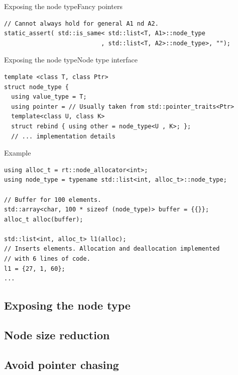 \documentclass[10pt,aspectratio=169]{beamer}
\begin{document}
\begin{frame}[fragile]{Exposing the node type}{Fancy pointers}

\begin{lstlisting}
// Cannot always hold for general A1 nd A2.
static_assert( std::is_same< std::list<T, A1>::node_type
                           , std::list<T, A2>::node_type>, "");
\end{lstlisting}

\end{frame}

\begin{frame}[fragile]{Exposing the node type}{Node type interface}

\begin{lstlisting}
template <class T, class Ptr>
struct node_type {
  using value_type = T;
  using pointer = // Usually taken from std::pointer_traits<Ptr>
  template<class U, class K>
  struct rebind { using other = node_type<U , K>; };
  // ... implementation details
\end{lstlisting}

\end{frame}

\begin{frame}[fragile]{Example}

\begin{lstlisting}
using alloc_t = rt::node_allocator<int>;
using node_type = typename std::list<int, alloc_t>::node_type;

// Buffer for 100 elements.
std::array<char, 100 * sizeof (node_type)> buffer = {{}};
alloc_t alloc(buffer);

std::list<int, alloc_t> l1(alloc);
// Inserts elements. Allocation and deallocation implemented
// with 6 lines of code.
l1 = {27, 1, 60};
...
\end{lstlisting}

\end{frame}

\subsection[Exposing the node type]{Exposing the node type}
\subsection[Node size reduction]{Node size reduction}
\subsection[Avoid pointer chasing]{Avoid pointer chasing}
\end{document}
